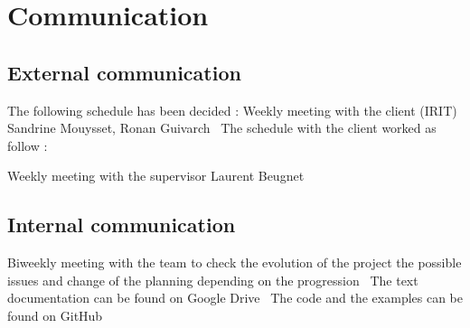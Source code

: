 \section{Communication}
\subsection{External communication}
The following schedule has been decided :
Weekly meeting with the client (IRIT) Sandrine Mouysset, Ronan Guivarch
\
The schedule with the client worked as follow :


Weekly meeting with the supervisor Laurent Beugnet
\
\subsection{Internal communication}
Biweekly meeting with the team to check the evolution of the project the possible issues and change of the planning depending on the progression
\
The text documentation can be found on Google Drive
\
The code and the examples can be found on  GitHub


